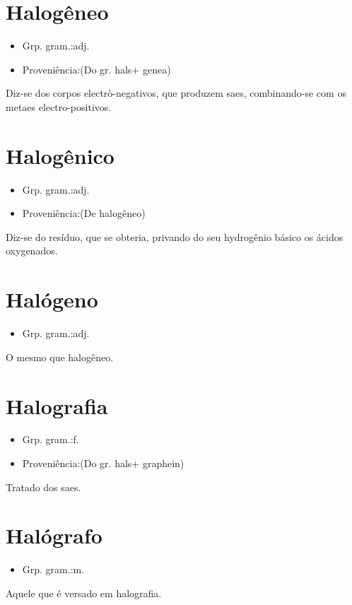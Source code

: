 \documentclass{article}
\begin{document}
\section{Halogêneo}
\begin{itemize}
\item {Grp. gram.:adj.}
\end{itemize}
\begin{itemize}
\item {Proveniência:(Do gr. \textunderscore hals\textunderscore  + \textunderscore genea\textunderscore )}
\end{itemize}
Diz-se dos corpos electrò-negativos, que produzem saes, combinando-se com os metaes electro-positivos.
\section{Halogênico}
\begin{itemize}
\item {Grp. gram.:adj.}
\end{itemize}
\begin{itemize}
\item {Proveniência:(De \textunderscore halogêneo\textunderscore )}
\end{itemize}
Diz-se do resíduo, que se obteria, privando do seu hydrogênio básico os ácidos oxygenados.
\section{Halógeno}
\begin{itemize}
\item {Grp. gram.:adj.}
\end{itemize}
O mesmo que \textunderscore halogêneo\textunderscore .
\section{Halografia}
\begin{itemize}
\item {Grp. gram.:f.}
\end{itemize}
\begin{itemize}
\item {Proveniência:(Do gr. \textunderscore hals\textunderscore  + \textunderscore graphein\textunderscore )}
\end{itemize}
Tratado dos saes.
\section{Halógrafo}
\begin{itemize}
\item {Grp. gram.:m.}
\end{itemize}
Aquele que é versado em halografia.
\end{document}
